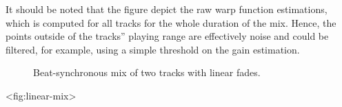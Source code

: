 It should be noted that the figure depict the raw warp function
estimations, which is computed for all tracks for the whole duration of
the mix. Hence, the points outside of the tracks'' playing range are
effectively noise and could be filtered, for example, using a simple
threshold on the gain estimation.

\begin{figure}
\centering

\caption{Beat-synchronous mix of two tracks with linear fades.}
\end{figure}

\textless fig:linear-mix\textgreater{}
